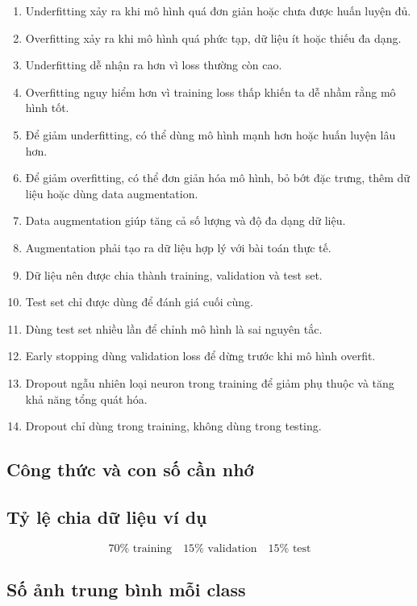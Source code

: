 \begin{enumerate}
    \item Underfitting xảy ra khi mô hình quá đơn giản hoặc chưa được huấn luyện đủ.
    \item Overfitting xảy ra khi mô hình quá phức tạp, dữ liệu ít hoặc thiếu đa dạng.
    \item Underfitting dễ nhận ra hơn vì loss thường còn cao.
    \item Overfitting nguy hiểm hơn vì training loss thấp khiến ta dễ nhầm rằng mô hình tốt.
    \item Để giảm underfitting, có thể dùng mô hình mạnh hơn hoặc huấn luyện lâu hơn.
    \item Để giảm overfitting, có thể đơn giản hóa mô hình, bỏ bớt đặc trưng, thêm dữ liệu hoặc dùng data augmentation.
    \item Data augmentation giúp tăng cả số lượng và độ đa dạng dữ liệu.
    \item Augmentation phải tạo ra dữ liệu hợp lý với bài toán thực tế.
    \item Dữ liệu nên được chia thành training, validation và test set.
    \item Test set chỉ được dùng để đánh giá cuối cùng.
    \item Dùng test set nhiều lần để chỉnh mô hình là sai nguyên tắc.
    \item Early stopping dùng validation loss để dừng trước khi mô hình overfit.
    \item Dropout ngẫu nhiên loại neuron trong training để giảm phụ thuộc và tăng khả năng tổng quát hóa.
    \item Dropout chỉ dùng trong training, không dùng trong testing.
\end{enumerate}

\subsection{Công thức và con số cần nhớ}

\subsection*{Tỷ lệ chia dữ liệu ví dụ}

\[
    70\% \text{ training}
    \quad
    15\% \text{ validation}
    \quad
    15\% \text{ test}
\]

\subsection*{Số ảnh trung bình mỗi class}

